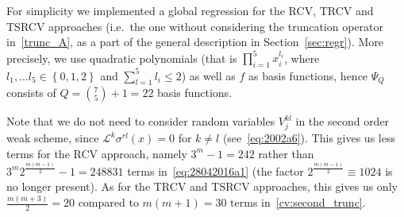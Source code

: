 \documentclass[11pt,a4paper]{amsart}
\theoremstyle{plain}
\theoremstyle{definition}
\theoremstyle{remark}
\numberwithin{equation}{section}
\newcommand*{\cL}{\mathcal L}
\begin{document}
For simplicity we implemented a global regression for the RCV, TRCV and TSRCV approaches
(i.e.\ the one without considering the truncation operator in~\eqref{trunc_A}, as a part of the general description in Section~\ref{sec:regr}). 
More precisely, we use
quadratic polynomials (that is $\prod_{i=1}^5x_i^{l_i}$,
where $l_1,\ldots l_5\in\left\{0,1,2\right\}$
and $\sum_{l=1}^5l_i\leq 2$) as well as $f$ as basis functions, hence $\Psi_Q$ consists of $Q=\binom{7}{5}+1=22$ basis functions. \par
Note that we do not need to consider random variables $V_j^{kl}$
in the second order weak scheme,
since $\cL^k\sigma^{rl}(x)=0$ for $k\ne l$ (see~\eqref{eq:2002a6}).
This gives us less terms for the RCV approach, namely $3^m-1=242$ rather than $3^m2^\frac{m(m-1)}{2}-1=248831$ terms in~\eqref{eq:28042016a1} (the factor $2^{\frac{m(m-1)}2}\equiv 1024$ is no longer present). As for the TRCV
and TSRCV approaches,
this gives us only $\frac{m(m+3)}{2}=20$ compared to $m(m+1)=30$ terms in~\eqref{cv:second_trunc}.
\end{document}
